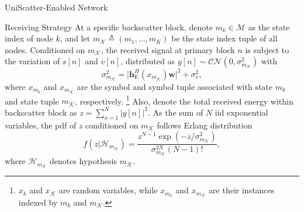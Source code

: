 \documentclass[journal]{IEEEtran}
\begin{document}
\begin{section}{UniScatter-Enabled Network}
\begin{subsection}{Receiving Strategy}
		At a specific backscatter block, denote $m_k \in \mathcal{M}$ as the state index of node $k$, and let $m_{\mathcal{K}} \triangleq (m_1,\ldots,m_K)$ be the state index tuple of all nodes.
		Conditioned on $m_{\mathcal{K}}$, the received signal at primary block $n$ is subject to the variation of $s[n]$ and $v[n]$, distributed as $y[n] \sim \mathcal{CN}(0,\sigma_{m_{\mathcal{K}}}^2)$ with
		\begin{equation}
			\sigma_{m_{\mathcal{K}}}^2 = \lvert \boldsymbol{h}_{\mathrm{E}}^H(x_{m_{\mathcal{K}}}) \boldsymbol{w} \rvert^2 + \sigma_v^2,
			\label{eq:receive_variance}
		\end{equation}
		where $x_{m_k}$ and $x_{m_\mathcal{K}}$ are the symbol and symbol tuple associated with state $m_k$ and state tuple $m_{\mathcal{K}}$, respectively.%
		\footnote{
			$x_k$ and $x_{\mathcal{K}}$ are random variables, while $x_{m_k}$ and $x_{m_{\mathcal{K}}}$ are their instances indexed by $m_k$ and $m_{\mathcal{K}}$.
		}
		Also, denote the total received energy within backscatter block as $z=\sum_{n=1}^N \lvert y[n] \rvert^2$.
		As the sum of $N$ \gls{iid} exponential variables, the \gls{pdf} of $z$ conditioned on $m_{\mathcal{K}}$ follows Erlang distribution
		\begin{equation}
			f(z|\mathcal{H}_{m_{\mathcal{K}}}) = \frac{z^{N-1} \exp(-z/\sigma_{m_{\mathcal{K}}}^2)}{\sigma_{m_{\mathcal{K}}}^{2N} (N-1)!},
			\label{eq:energy_distribution}
		\end{equation}
		where $\mathcal{H}_{m_{\mathcal{K}}}$ denotes hypothesis $m_{\mathcal{K}}$.

\end{subsection}
\end{section}
\end{document}
